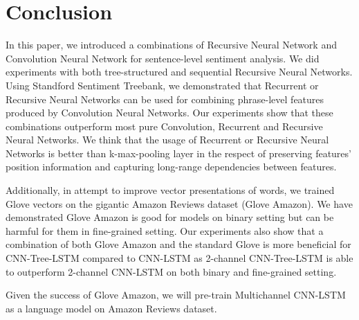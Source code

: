 \section{Conclusion}
In this paper, we introduced a combinations of Recursive Neural Network and Convolution Neural Network for sentence-level sentiment analysis.
We did experiments with both tree-structured and sequential Recursive Neural Networks.
Using Standford Sentiment Treebank, we demonstrated that Recurrent or Recursive Neural Networks can be used for combining phrase-level features produced by Convolution Neural Networks.
Our experiments show that these combinations outperform most pure Convolution, Recurrent and Recursive Neural Networks. 
We think that the usage of Recurrent or Recursive Neural Networks is better than k-max-pooling layer in the respect of preserving features' position information and capturing long-range dependencies between features. 

Additionally, in attempt to improve vector presentations of words, we trained Glove vectors on the gigantic Amazon Reviews dataset (Glove Amazon).
We have demonstrated Glove Amazon is good for models on binary setting but can be harmful for them in fine-grained setting.
Our experiments also show that a combination of both Glove Amazon and the standard Glove is more beneficial for CNN-Tree-LSTM compared to CNN-LSTM as 2-channel CNN-Tree-LSTM is able to outperform 2-channel CNN-LSTM on both binary and fine-grained setting.

Given the success of Glove Amazon, we will pre-train Multichannel CNN-LSTM as a language model on Amazon Reviews dataset.

